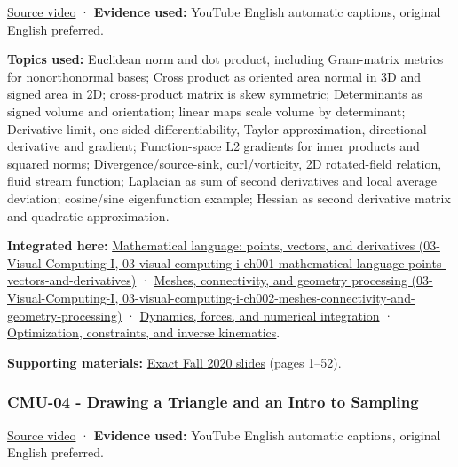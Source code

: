 \href{https://www.youtube.com/watch?v=O7Bec2uX3ZQ}{Source video} · \textbf{Evidence used:} YouTube English automatic captions, original English preferred.

\textbf{Topics used:} Euclidean norm and dot product, including Gram-matrix metrics for nonorthonormal bases; Cross product as oriented area normal in 3D and signed area in 2D; cross-product matrix is skew symmetric; Determinants as signed volume and orientation; linear maps scale volume by determinant; Derivative limit, one-sided differentiability, Taylor approximation, directional derivative and gradient; Function-space L2 gradients for inner products and squared norms; Divergence/source-sink, curl/vorticity, 2D rotated-field relation, fluid stream function; Laplacian as sum of second derivatives and local average deviation; cosine/sine eigenfunction example; Hessian as second derivative matrix and quadratic approximation.

\textbf{Integrated here:} \href{../03-Visual-Computing-I/main.pdf\#nameddest=03-visual-computing-i-ch001-mathematical-language-points-vectors-and-derivatives}{Mathematical language: points, vectors, and derivatives (03-Visual-Computing-I, 03-visual-computing-i-ch001-mathematical-language-points-vectors-and-derivatives)} · \href{../03-Visual-Computing-I/main.pdf\#nameddest=03-visual-computing-i-ch002-meshes-connectivity-and-geometry-processing}{Meshes, connectivity, and geometry processing (03-Visual-Computing-I, 03-visual-computing-i-ch002-meshes-connectivity-and-geometry-processing)} · \hyperref[04-visual-computing-ii-ch029-dynamics-forces-and-numerical-integration]{Dynamics, forces, and numerical integration} · \hyperref[04-visual-computing-ii-ch029-optimization-constraints-and-inverse-kinematics]{Optimization, constraints, and inverse kinematics}.

\textbf{Supporting materials:} \href{https://15462.courses.cs.cmu.edu/fall2020content/lectures/03_vectorcalc/03_vectorcalc_slides.pdf}{Exact Fall 2020 slides} (pages 1--52).

\subsubsection{CMU-04 - Drawing a Triangle and an Intro to Sampling}\label{04-visual-computing-ii-ch036-cmu-04---drawing-a-triangle-and-an-intro-to-sampling}

\href{https://www.youtube.com/watch?v=B0hsT2npIc0}{Source video} · \textbf{Evidence used:} YouTube English automatic captions, original English preferred.

